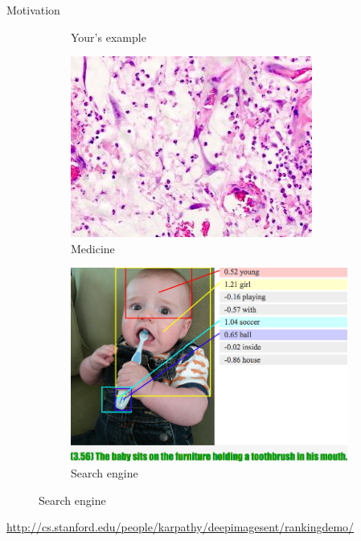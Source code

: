 \documentclass{beamer}
\begin{document}
\begin{frame}{Motivation}
\begin{itemize}
\begin{figure}[htbp]
\begin{subfigure}[b]{0.25\textwidth}
				\caption{Your's example}
			\end{subfigure}
			\begin{subfigure}[b]{0.25\textwidth}
				\includegraphics[width=\textwidth]{img/mic}
				\caption{Medicine}
			\end{subfigure}
			\begin{subfigure}[b]{0.25\textwidth}
				\includegraphics[width=\textwidth]{img/baby}
				\caption{Search engine}
			\end{subfigure}

		\end{figure}
			
			\href{http://cs.stanford.edu/people/karpathy/deepimagesent/rankingdemo/}{http://cs.stanford.edu/people/karpathy/deepimagesent/rankingdemo/}
	\end{itemize}

\end{frame}
\end{document}
